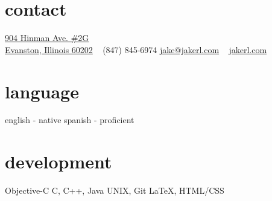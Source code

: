 \documentclass[print]{resume}
\begin{document}

\begin{aside}
\section{contact}
\href{https://www.google.com/maps/place/904+Hinman+Ave,+Evanston,+IL+60202/}{904 Hinman Ave. \#2G\\ Evanston, Illinois 60202}
~
(847) 845-6974
\href{mailto:jake@jakerl.com}{jake@jakerl.com}
~
\href{http://www.jakerl.com}{jakerl.com}
\section{language}
english - native
spanish - proficient
\section{development}
Objective-C
C, C++, Java
UNIX, Git
\LaTeX, HTML/CSS 

\end{aside}
\end{document}
